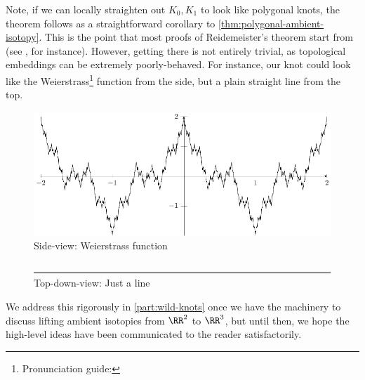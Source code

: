 Note, if we can locally straighten out $K_0, K_1$ to look like
polygonal knots, the theorem follows as a straightforward corollary to
\cref{thm:polygonal-ambient-isotopy}. This is the point that most
proofs of Reidemeister's theorem start from (see
\cite{prasolov1997knots}, for instance). However, getting there is not
entirely trivial, as topological embeddings can be extremely
poorly-behaved. For instance, our knot could look like the
Weierstrass\footnote{Pronunciation guide: } function
from the side, but a plain straight line from the top.
\begin{figure}[H]
  \centering
  \includegraphics[scale=.9]{figures/fundamentals/weirstrass.pdf}
  \caption{Side-view: Weierstrass function}
\end{figure}
\begin{figure}[H]
  \centering
  \includegraphics[scale=1.3]{figures/fundamentals/straight-line.pdf}
  \caption{Top-down-view: Just a line}
\end{figure}
We address this rigorously in \cref{part:wild-knots} once we have the
machinery to discuss lifting ambient isotopies from $\RR^2$ to
$\RR^3$, but until then, we hope the high-level ideas have been
communicated to the reader satisfactorily.%

